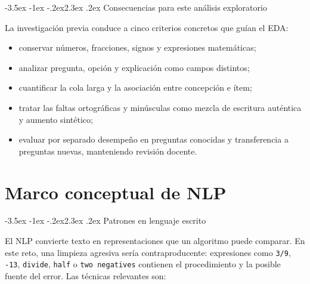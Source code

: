 \documentclass[11pt,oneside,openany]{book}
\makeatletter
\renewcommand\section{\@startsection{section}{1}{\z@}%
  {-3.5ex \@plus -1ex \@minus -.2ex}{2.3ex \@plus .2ex}%
  {\normalfont\Large\sffamily\bfseries\color{AzulMedio}}}
\newcommand{\codigo}[1]{\texttt{#1}}
\makeatother
\begin{document}
\section{Consecuencias para este análisis exploratorio}

La investigación previa conduce a cinco criterios concretos que guían el EDA:

\begin{itemize}
  \item conservar números, fracciones, signos y expresiones matemáticas;
  \item analizar pregunta, opción y explicación como campos distintos;
  \item cuantificar la cola larga y la asociación entre concepción e ítem;
  \item tratar las faltas ortográficas y minúsculas como mezcla de escritura
        auténtica y aumento sintético;
  \item evaluar por separado desempeño en preguntas conocidas y transferencia
        a preguntas nuevas, manteniendo revisión docente.
\end{itemize}

\chapter{Marco conceptual de NLP}

\section{Patrones en lenguaje escrito}

El NLP convierte texto en representaciones que un algoritmo puede comparar.
En este reto, una limpieza agresiva sería contraproducente: expresiones como
\codigo{3/9}, \codigo{-13}, \codigo{divide}, \codigo{half} o
\codigo{two negatives} contienen el procedimiento y la posible fuente del
error. Las técnicas relevantes son:
\end{document}
